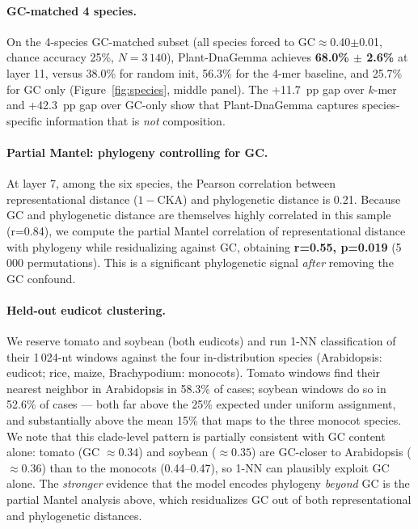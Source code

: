 \documentclass{article}
\begin{document}
\paragraph{GC-matched 4 species.}
On the 4-species GC-matched subset (all species forced to
GC$\approx$0.40$\pm$0.01, chance accuracy 25\%, $N{=}3\,140$), Plant-DnaGemma
achieves \textbf{68.0\% $\pm$ 2.6\%} at layer 11, versus 38.0\% for random
init, 56.3\% for the 4-mer baseline, and 25.7\% for GC only
(Figure~\ref{fig:species}, middle panel). The +11.7~pp gap over $k$-mer and
+42.3~pp gap over GC-only show that Plant-DnaGemma captures species-specific
information that is \emph{not} composition.

\paragraph{Partial Mantel: phylogeny controlling for GC.}
At layer 7, among the six species, the Pearson correlation between
representational distance ($1-\text{CKA}$) and phylogenetic distance is 0.21.
Because GC and phylogenetic distance are themselves highly correlated in this
sample (r=0.84), we compute the partial Mantel correlation of
representational distance with phylogeny while residualizing against GC,
obtaining \textbf{r=0.55, p=0.019} (5\,000 permutations). This is a
significant phylogenetic signal \emph{after} removing the GC confound.

\paragraph{Held-out eudicot clustering.}
We reserve tomato and soybean (both eudicots) and run 1-NN classification of
their 1\,024-nt windows against the four in-distribution species
(Arabidopsis: eudicot; rice, maize, Brachypodium: monocots). Tomato windows
find their nearest neighbor in Arabidopsis in 58.3\% of cases; soybean
windows do so in 52.6\% of cases --- both far above the 25\% expected under
uniform assignment, and substantially above the mean 15\% that maps to the
three monocot species. We note that this clade-level pattern is partially
consistent with GC content alone: tomato (GC $\approx 0.34$) and soybean
($\approx 0.35$) are GC-closer to Arabidopsis ($\approx 0.36$) than to the
monocots (0.44--0.47), so 1-NN can plausibly exploit GC alone. The
\emph{stronger} evidence that the model encodes phylogeny \emph{beyond} GC
is the partial Mantel analysis above, which residualizes GC out of both
representational and phylogenetic distances.
\end{document}
